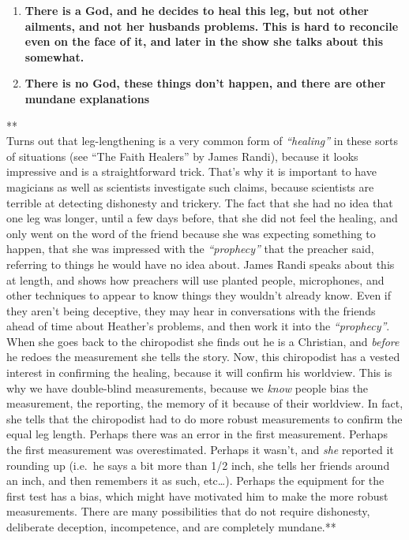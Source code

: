 \begin{enumerate}
\def\labelenumi{\arabic{enumi}.}
\itemsep1pt\parskip0pt
\item
  \textbf{There is a God, and he decides to heal this leg, but not other
  ailments, and not her husbands problems. This is hard to reconcile
  even on the face of it, and later in the show she talks about this
  somewhat.}
\item
  \textbf{There is no God, these things don't happen, and there are
  other mundane explanations}
\end{enumerate}

**\\Turns out that leg-lengthening is a very common form of
\emph{``healing''} in these sorts of situations (see ``The Faith
Healers'' by James Randi), because it looks impressive and is a
straightforward trick. That's why it is important to have magicians as
well as scientists investigate such claims, because scientists are
terrible at detecting dishonesty and trickery. The fact that she had no
idea that one leg was longer, until a few days before, that she did not
feel the healing, and only went on the word of the friend because she
was expecting something to happen, that she was impressed with the
\emph{``prophecy''} that the preacher said, referring to things he would
have no idea about. James Randi speaks about this at length, and shows
how preachers will use planted people, microphones, and other techniques
to appear to know things they wouldn't already know. Even if they aren't
being deceptive, they may hear in conversations with the friends ahead
of time about Heather's problems, and then work it into the
\emph{``prophecy''}. When she goes back to the chiropodist she finds out
he is a Christian, and \emph{before} he redoes the measurement she tells
the story. Now, this chiropodist has a vested interest in confirming the
healing, because it will confirm his worldview. This is why we have
double-blind measurements, because we \emph{know} people bias the
measurement, the reporting, the memory of it because of their worldview.
In fact, she tells that the chiropodist had to do more robust
measurements to confirm the equal leg length. Perhaps there was an error
in the first measurement. Perhaps the first measurement was
overestimated. Perhaps it wasn't, and \emph{she} reported it rounding up
(i.e.~he says a bit more than 1/2 inch, she tells her friends around an
inch, and then remembers it as such, etc\ldots{}). Perhaps the equipment
for the first test has a bias, which might have motivated him to make
the more robust measurements. There are many possibilities that do not
require dishonesty, deliberate deception, incompetence, and are
completely mundane.**

